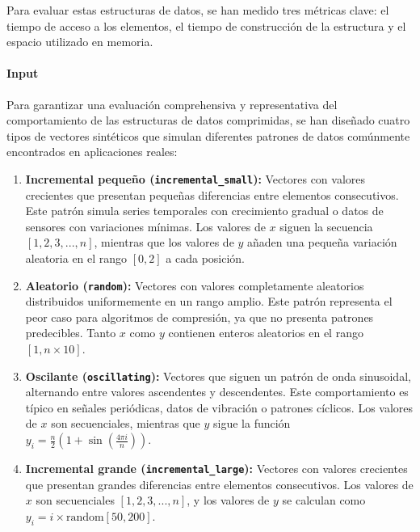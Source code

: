 Para evaluar estas estructuras de datos, se han medido tres métricas clave: el tiempo de acceso a los elementos, el tiempo de construcción de la estructura y el espacio utilizado en memoria. 

\paragraph{Input}
\vspace{0.2cm}

Para garantizar una evaluación comprehensiva y representativa del comportamiento de las estructuras de datos comprimidas, se han diseñado cuatro tipos de vectores sintéticos que simulan diferentes patrones de datos comúnmente encontrados en aplicaciones reales:

\begin{enumerate}
    \item \textbf{Incremental pequeño (\texttt{incremental\_small}):} Vectores con valores crecientes que presentan pequeñas diferencias entre elementos consecutivos. Este patrón simula series temporales con crecimiento gradual o datos de sensores con variaciones mínimas. Los valores de $x$ siguen la secuencia $[1, 2, 3, ..., n]$, mientras que los valores de $y$ añaden una pequeña variación aleatoria en el rango $[0, 2]$ a cada posición.

    \item \textbf{Aleatorio (\texttt{random}):} Vectores con valores completamente aleatorios distribuidos uniformemente en un rango amplio. Este patrón representa el peor caso para algoritmos de compresión, ya que no presenta patrones predecibles. Tanto $x$ como $y$ contienen enteros aleatorios en el rango $[1, n \times 10]$.

    \item \textbf{Oscilante (\texttt{oscillating}):} Vectores que siguen un patrón de onda sinusoidal, alternando entre valores ascendentes y descendentes. Este comportamiento es típico en señales periódicas, datos de vibración o patrones cíclicos. Los valores de $x$ son secuenciales, mientras que $y$ sigue la función $y_i = \frac{n}{2}(1 + \sin(\frac{4\pi i}{n}))$.

    \item \textbf{Incremental grande (\texttt{incremental\_large}):} Vectores con valores crecientes que presentan grandes diferencias entre elementos consecutivos. Los valores de $x$ son secuenciales $[1, 2, 3, ..., n]$, y los valores de $y$ se calculan como $y_i = i \times \text{random}[50, 200]$.
\end{enumerate}


